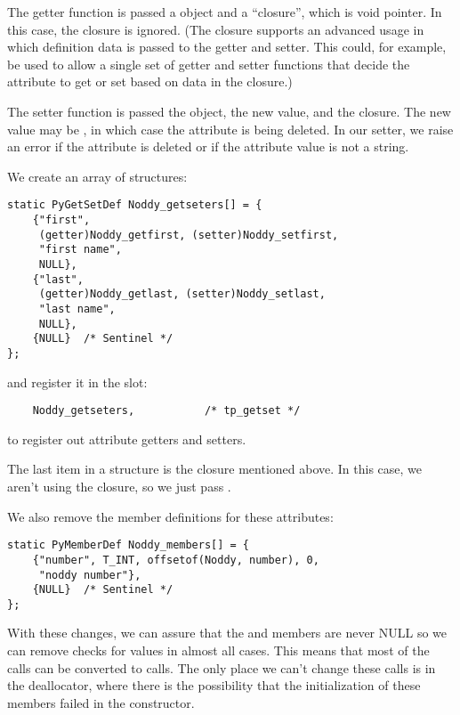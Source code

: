 The getter function is passed a  object and a
``closure'', which is void pointer. In this case, the closure is
ignored. (The closure supports an advanced usage in which definition
data is passed to the getter and setter. This could, for example, be
used to allow a single set of getter and setter functions that decide
the attribute to get or set based on data in the closure.)

The setter function is passed the  object, the new value,
and the closure. The new value may be \NULL, in which case the
attribute is being deleted.  In our setter, we raise an error if the
attribute is deleted or if the attribute value is not a string.

We create an array of  structures:

\begin{verbatim}
static PyGetSetDef Noddy_getseters[] = {
    {"first", 
     (getter)Noddy_getfirst, (setter)Noddy_setfirst,
     "first name",
     NULL},
    {"last", 
     (getter)Noddy_getlast, (setter)Noddy_setlast,
     "last name",
     NULL},
    {NULL}  /* Sentinel */
};
\end{verbatim}

and register it in the  slot:

\begin{verbatim}
    Noddy_getseters,           /* tp_getset */
\end{verbatim}

to register out attribute getters and setters.  

The last item in a  structure is the closure
mentioned above. In this case, we aren't using the closure, so we just
pass \NULL.

We also remove the member definitions for these attributes:

\begin{verbatim}
static PyMemberDef Noddy_members[] = {
    {"number", T_INT, offsetof(Noddy, number), 0,
     "noddy number"},
    {NULL}  /* Sentinel */
};
\end{verbatim}

With these changes, we can assure that the  and
 members are never NULL so we can remove checks for \NULL
values in almost all cases. This means that most of the
 calls can be converted to 
calls. The only place we can't change these calls is in the
deallocator, where there is the possibility that the initialization of
these members failed in the constructor.


